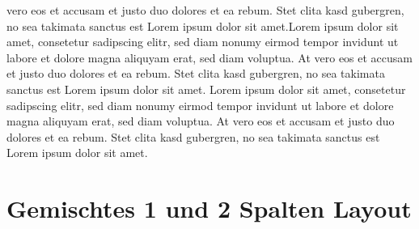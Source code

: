 \documentclass[
  twoside]{article}
\begin{document}
vero eos et accusam et justo duo dolores et ea rebum. Stet clita kasd
gubergren, no sea takimata sanctus est Lorem ipsum dolor sit amet.Lorem
ipsum dolor sit amet, consetetur sadipscing elitr, sed diam nonumy
eirmod tempor invidunt ut labore et dolore magna aliquyam erat, sed diam
voluptua. At vero eos et accusam et justo duo dolores et ea rebum. Stet
clita kasd gubergren, no sea takimata sanctus est Lorem ipsum dolor sit
amet. Lorem ipsum dolor sit amet, consetetur sadipscing elitr, sed diam
nonumy eirmod tempor invidunt ut labore et dolore magna aliquyam erat,
sed diam voluptua. At vero eos et accusam et justo duo dolores et ea
rebum. Stet clita kasd gubergren, no sea takimata sanctus est Lorem
ipsum dolor sit amet.

\newpage

\hypertarget{gemischtes-1-und-2-spalten-layout}{%
\section{Gemischtes 1 und 2 Spalten
Layout}\label{gemischtes-1-und-2-spalten-layout}}
\end{document}
